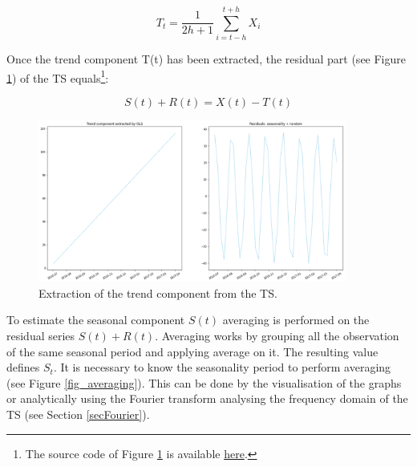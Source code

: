 \begin{equation}
T_t=\frac{1}{2h+1}\sum_{i=t-h}^{t+h}X_i
\label{eq_trendTS}
\end{equation}

Once the trend component T(t) has been extracted, the residual part (see Figure \ref{fig_extractedTrend})  of the TS equals\footnote{The source code of Figure \ref{fig_extractedTrend} is available \href{https://github.com/aletuf93/logproj/blob/master/examples/03.\%20Statistics.ipynb}{here}.}: 

\begin{equation}
S(t)+R(t)=X(t)-T(t)
\label{eq_extractedTrend}
\end{equation}

\begin{figure}[hbt!]
\centering
\includegraphics[width=0.9\textwidth]{SectionLetsMath/elemStat_figures/fig_extractedTrend.png}
\captionsetup{type=figure}
\caption{Extraction of the trend component from the TS.}
\label{fig_extractedTrend}
\end{figure}

To estimate the seasonal component $S(t)$ averaging is performed on the residual series $S\left(t\right)+R(t)$. Averaging works by grouping all the observation of the same seasonal period and applying average on it. The resulting value defines $S_t$. It is necessary to know the seasonality period to perform averaging (see Figure \ref{fig_averaging}). This can be done by the visualisation of the graphs or analytically using the Fourier transform analysing the frequency domain of the TS (see Section \ref{secFourier}).

